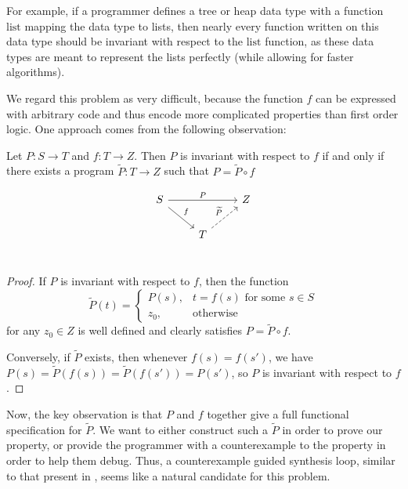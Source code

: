 \documentclass{llncs}
\begin{document}
For example, if a programmer defines a tree or heap data type with a function
$\mathrm{list}$ mapping the data type to lists,
then nearly every function written on this data type should be invariant with
respect to the $\mathrm{list}$ function,
as these data types are meant to represent the lists perfectly (while allowing
for faster algorithms).

We regard this problem as very difficult, because the function $f$ can be
expressed with arbitrary code and thus encode more complicated properties than
first order logic. One approach comes from the following observation:

\begin{lemma} Let $P : S \to T$ and $f : T \to Z$.
  Then $P$ is invariant with respect to $f$ if and only if
  there exists a program $\widetilde{P} : T\to Z$
  such that $P = \widetilde{P} \circ f$
\end{lemma}
  \[
    \begin{tikzcd}
      S \arrow{rr}{P} \arrow{rd}{f} &   & Z \\
      & T \arrow[dashed]{ru}{\widetilde{P}} &   \\
    \end{tikzcd}
  \]
\begin{proof}
  If $P$ is invariant with respect to $f$, then the function
  \[ \widetilde{P}(t) = \begin{cases}
       P(s), & t = f(s) \text{ for some $s\in S$} \\
       z_0, & \text{otherwise}
     \end{cases}
  \]
  for any $z_0 \in Z$
  is well defined and clearly satisfies $P = \widetilde{P} \circ f$.

  Conversely, if $\widetilde{P}$ exists, then whenever $f(s)=f(s')$,
  we have $P(s) = \widetilde{P}(f(s)) = \widetilde{P}(f(s')) = P(s')$,
  so $P$ is invariant with respect to $f$.
\end{proof}

Now, the key observation is that $P$ and $f$ together give a full functional
specification for $\widetilde{P}$.
We want to either construct such a $\widetilde{P}$ in order to prove our
property, or provide the programmer with a counterexample to the property in
order to help them debug.
Thus, a counterexample guided synthesis loop,
similar to that present in \cite{solar06},
seems like a natural candidate for this problem.
\end{document}
